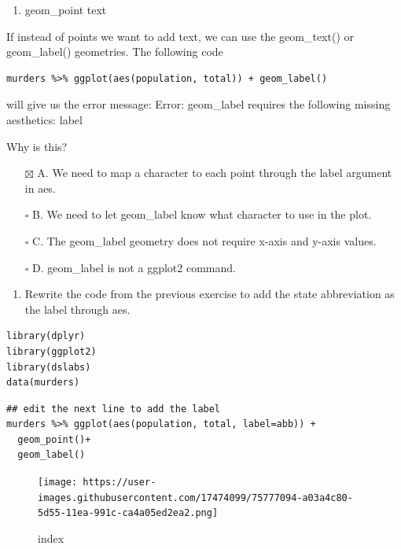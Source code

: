 \documentclass[
]{article}
\providecommand{\tightlist}{%
  \setlength{\itemsep}{0pt}\setlength{\parskip}{0pt}}
\begin{document}
\begin{enumerate}
\def\labelenumi{\arabic{enumi}.}
\setcounter{enumi}{6}
\tightlist
\item
  geom\_point text
\end{enumerate}

If instead of points we want to add text, we can use the geom\_text() or
geom\_label() geometries. The following code

\begin{verbatim}
murders %>% ggplot(aes(population, total)) + geom_label()
\end{verbatim}

will give us the error message: Error: geom\_label requires the
following missing aesthetics: label

Why is this?

\begin{itemize}
\tightlist
\item[$\boxtimes$]
  A. We need to map a character to each point through the label argument
  in aes.
\item[$\square$]
  B. We need to let geom\_label know what character to use in the plot.
\item[$\square$]
  C. The geom\_label geometry does not require x-axis and y-axis values.
\item[$\square$]
  D. geom\_label is not a ggplot2 command.
\end{itemize}

\begin{enumerate}
\def\labelenumi{\arabic{enumi}.}
\setcounter{enumi}{7}
\tightlist
\item
  Rewrite the code from the previous exercise to add the state
  abbreviation as the label through aes.
\end{enumerate}

\begin{verbatim}
library(dplyr)
library(ggplot2)
library(dslabs)
data(murders)
\end{verbatim}

\begin{verbatim}
## edit the next line to add the label
murders %>% ggplot(aes(population, total, label=abb)) +
  geom_point()+
  geom_label()
\end{verbatim}

\begin{figure}
\centering
\texttt{[image: https://user-images.githubusercontent.com/17474099/75777094-a03a4c80-5d55-11ea-991c-ca4a05ed2ea2.png]}
\caption{index}
\end{figure}
\end{document}
